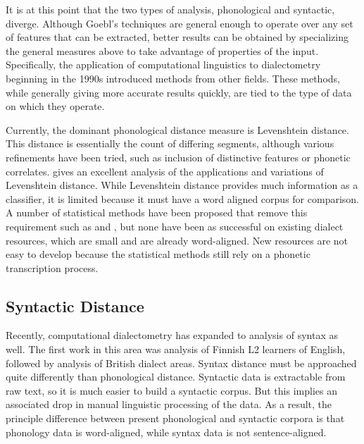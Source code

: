 \documentclass[11pt]{article}
\begin{document}
It is at this point that the two types of analysis, phonological and
syntactic, diverge. Although Goebl's techniques are general enough to
operate over any set of features that can be extracted, better results
can be obtained by specializing the general measures above to take
advantage of properties of the input.  Specifically, the application
of computational linguistics to dialectometry beginning in the 1990s
introduced methods from other fields. These methods, while generally
giving more accurate results quickly, are tied to the type of data on
which they operate.

Currently, the dominant phonological distance measure is Levenshtein
distance. This distance is essentially the count of differing
segments, although various refinements have been tried, such as
inclusion of distinctive features or phonetic
correlates.  gives an excellent analysis of the
applications and variations of Levenshtein distance. While Levenshtein
distance provides much information as a classifier, it is limited
because it must have a word aligned corpus for comparison. A number of
statistical methods have been proposed that remove this requirement
such as  and , but none have
been as successful on existing dialect resources, which are small and
are already word-aligned. New resources are not easy to develop
because the statistical methods still rely on a phonetic transcription
process.


\subsection{Syntactic  Distance}

Recently, computational dialectometry has expanded to analysis of
syntax as well. The first work in this area was 
analysis of Finnish L2 learners of English, followed by
 analysis of British dialect areas. Syntax
distance must be approached quite differently than phonological
distance. Syntactic data is extractable from raw text, so it is much
easier to build a syntactic corpus. But this implies an associated
drop in manual linguistic processing of the data. As a result, the
principle difference between present phonological and syntactic
corpora is that phonology data is word-aligned, while syntax data is
not sentence-aligned.
\end{document}
